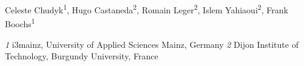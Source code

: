 
Celeste Chudyk\textsuperscript{1}, Hugo Castaneda\textsuperscript{2}, Romain Leger\textsuperscript{2}, Islem Yahiaoui\textsuperscript{2}, Frank Boochs\textsuperscript{1}

\textit{1}  i3mainz, University of Applied Sciences Mainz, Germany                                                                         
\textit{2}  Dijon Institute of Technology, Burgundy University, France